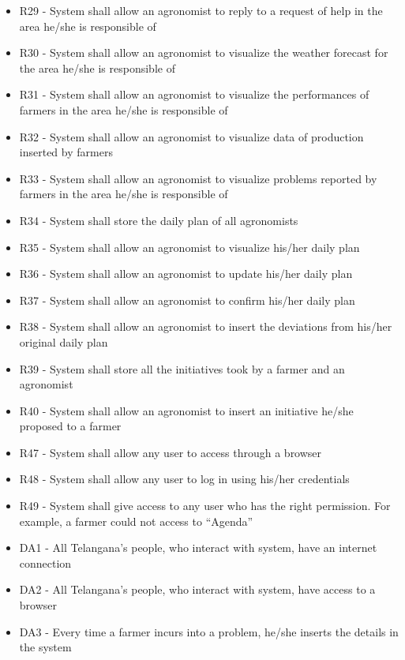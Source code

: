 \begin{enumerate}[label=\textbf{G.\arabic*}]
\begin{enumerate} [label=\textbf{G.4.\arabic*}]
\begin{itemize} [label =]
            \item R29 - System shall allow an agronomist to reply to a request of help in the area he/she is responsible of
            \item R30 - System shall allow an agronomist to visualize the weather forecast for the area he/she is responsible of
            \item R31 - System shall allow an agronomist to visualize the performances of farmers in the area he/she is responsible of
            \item R32 - System shall allow an agronomist to visualize data of production inserted by farmers
            \item R33 - System shall allow an agronomist to visualize problems reported by farmers in the area he/she is responsible of
            \item R34 - System shall store the daily plan of all agronomists
            \item R35 - System shall allow an agronomist to visualize his/her daily plan
            \item R36 - System shall allow an agronomist to update his/her daily plan
            \item R37 - System shall allow an agronomist to confirm his/her daily plan
            \item R38 - System shall allow an agronomist to insert the deviations from his/her original daily plan
            \item R39 - System shall store all the initiatives took by a farmer and an agronomist
            \item R40 - System shall allow an agronomist to insert an initiative he/she proposed to a farmer
            \item R47 - System shall allow any user to access through a browser
            \item R48 - System shall allow any user to log in using his/her credentials
            \item R49 - System shall give access to any user who has the right permission. For example, a farmer could not access to “Agenda”
            \item DA1 - All Telangana’s people, who interact with system, have an internet connection
            \item DA2 - All Telangana’s people, who interact with system, have access to a browser
            \item DA3 - Every time a farmer incurs into a problem, he/she inserts the details in the system

\end{itemize}
\end{enumerate}
\end{enumerate}
